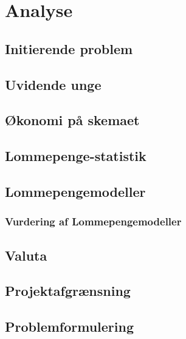 





\tableofcontents

\chapter{Analyse}

\section{Initierende problem}


\section{Uvidende unge}
\label{UvidendeUnge}


\section{Økonomi på skemaet}
\label{Okonomi}


\section{Lommepenge-statistik}
\label{LommeStat}


\section{Lommepengemodeller}
\label{LommeModeller}

\subsection{Vurdering af Lommepengemodeller}
\label{ModelVurdering}


\section{Valuta}
\label{Valuta}


\section{Projektafgrænsning}


\section{Problemformulering}



%





